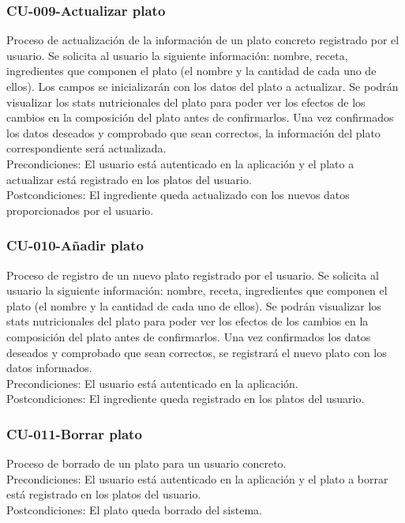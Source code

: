 \documentclass[12pt, a4paper, twoside]{book}
\begin{document}
	\subsubsection{CU-009-Actualizar plato}
	Proceso de actualización de la información de un plato concreto registrado por el usuario.
	Se solicita al usuario la siguiente información: nombre, receta, ingredientes que componen el plato (el nombre y la cantidad de cada uno de ellos).
	Los campos se inicializarán con los datos del plato a actualizar.
	Se podrán visualizar los stats nutricionales del plato para poder ver los efectos de los cambios en la composición del plato antes de confirmarlos.
	Una vez confirmados los datos deseados y comprobado que sean correctos, la información del plato correspondiente será actualizada.\\ 
	Precondiciones: El usuario está autenticado en la aplicación y el plato a actualizar está registrado en los platos del usuario.\\
	Postcondiciones: El ingrediente queda actualizado con los nuevos datos proporcionados por el usuario.
	\subsubsection{CU-010-Añadir plato}
	Proceso de registro de un nuevo plato registrado por el usuario.
	Se solicita al usuario la siguiente información: nombre, receta, ingredientes que componen el plato (el nombre y la cantidad de cada uno de ellos).
	Se podrán visualizar los stats nutricionales del plato para poder ver los efectos de los cambios en la composición del plato antes de confirmarlos.
	Una vez confirmados los datos deseados y comprobado que sean correctos, se registrará el nuevo plato con los datos informados.\\ 
	Precondiciones: El usuario está autenticado en la aplicación.\\
	Postcondiciones: El ingrediente queda registrado en los platos del usuario.
	\subsubsection{CU-011-Borrar plato}
	Proceso de borrado de un plato para un usuario concreto.\\
	Precondiciones: El usuario está autenticado en la aplicación y el plato a borrar está registrado en los platos del usuario.\\
	Postcondiciones: El plato queda borrado del sistema.
\end{document}
